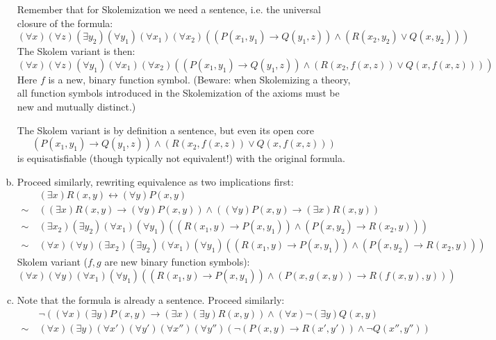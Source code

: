 \begin{problem}
\begin{solution}
\begin{enumerate}[(a)]
            Remember that for Skolemization we need a sentence, i.e. the universal closure of the formula:
            $$
            (\forall x)(\forall z)(\exists y_2)(\forall y_1)(\forall x_1)(\forall x_2)((P(x_1,y_1)\to Q(y_1,z))\wedge (R(x_2,y_2)\vee Q(x,y_2)))
            $$
            The Skolem variant is then:
            $$
            (\forall x)(\forall z)(\forall y_1)(\forall x_1)(\forall x_2)((P(x_1,y_1)\to Q(y_1,z))\wedge (R(x_2,f(x,z))\vee Q(x,f(x,z))))
            $$
            Here $f$ is a new, binary function symbol. (Beware: when Skolemizing a theory, all function symbols introduced in the Skolemization of the axioms must be new and mutually distinct.)
            
            The Skolem variant is by definition a sentence, but even its open core 
            $$
            (P(x_1,y_1)\to Q(y_1,z)) \wedge (R(x_2,f(x,z)) \vee Q(x,f(x,z)))
            $$
            is equisatisfiable (though typically not equivalent!) with the original formula.


            \item Proceed similarly, rewriting equivalence as two implications first:
            \begin{align*}
                &(\exists x)R(x,y)\leftrightarrow (\forall y)P(x,y)\\
                \sim\ &((\exists x)R(x,y)\to (\forall y)P(x,y))\land((\forall y)P(x,y)\to (\exists x)R(x,y))\\
                \sim\ &(\exists x_2)(\exists y_2)(\forall x_1)(\forall y_1)((R(x_1,y)\to P(x,y_1))\land(P(x,y_2)\to R(x_2,y)))\\
                \sim\ &(\forall x)(\forall y)(\exists x_2)(\exists y_2)(\forall x_1)(\forall y_1)((R(x_1,y)\to P(x,y_1))\land(P(x,y_2)\to R(x_2,y)))
            \end{align*}
            Skolem variant ($f,g$ are new binary function symbols):
            $$
            (\forall x)(\forall y)(\forall x_1)(\forall y_1)((R(x_1,y)\to P(x,y_1))\land(P(x,g(x,y))\to R(f(x,y),y)))
            $$

            \item Note that the formula is already a sentence. Proceed similarly:
            \begin{align*}
            &\neg((\forall x)(\exists y)P(x,y)\to (\exists x)(\exists y)R(x,y))\wedge(\forall x)\neg(\exists y)Q(x,y)\\
            \sim\ & (\forall x)(\exists y)(\forall x')(\forall y')(\forall x'')(\forall y'')
            (    
                \neg(P(x,y)\to R(x',y'))\wedge\neg Q(x'',y'') 
            )
            \end{align*}
            
        \end{enumerate}
                    
    \end{solution}

\end{problem}


